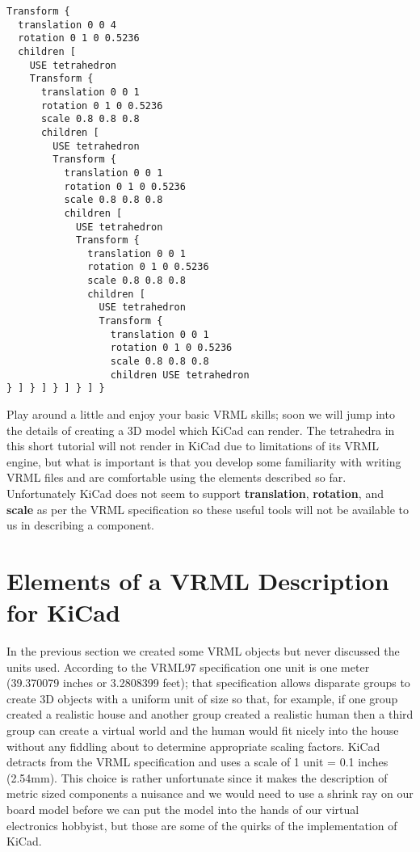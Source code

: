 \documentclass[a4paper, dvipdfm]{article}
\begin{document}
\begin{verbatim}
Transform {
  translation 0 0 4
  rotation 0 1 0 0.5236
  children [
    USE tetrahedron
    Transform {
      translation 0 0 1
      rotation 0 1 0 0.5236
      scale 0.8 0.8 0.8
      children [
        USE tetrahedron
        Transform {
          translation 0 0 1
          rotation 0 1 0 0.5236
          scale 0.8 0.8 0.8
          children [
            USE tetrahedron
            Transform {
              translation 0 0 1
              rotation 0 1 0 0.5236
              scale 0.8 0.8 0.8
              children [
                USE tetrahedron
                Transform {
                  translation 0 0 1
                  rotation 0 1 0 0.5236
                  scale 0.8 0.8 0.8
                  children USE tetrahedron
} ] } ] } ] } ] }
\end{verbatim}

Play around a little and enjoy your basic VRML skills; soon we will jump into the details of creating a
3D model which KiCad can render. The tetrahedra in this short tutorial will not render in KiCad due to
limitations of its VRML engine, but what is important is that you develop some familiarity with writing
VRML files and are comfortable using the elements described so far. Unfortunately KiCad does not seem to
support \textbf{translation}, \textbf{rotation}, and \textbf{scale} as per the VRML specification so these
useful tools will not be available to us in describing a component.

\section{Elements of a VRML Description for KiCad}
In the previous section we created some VRML objects but never discussed the units used. According to the VRML97
specification one unit is one meter (39.370079 inches or 3.2808399 feet); that specification allows disparate
groups to create 3D objects with a uniform unit of size so that, for example, if one group created a realistic
house and another group created a realistic human then a third group can create a virtual world and the human
would fit nicely into the house without any fiddling about to determine appropriate scaling factors. KiCad
detracts from the VRML specification and uses a scale of 1 unit = 0.1 inches (2.54mm). This choice is rather
unfortunate since it makes the description of metric sized components a nuisance and we would need to use a
shrink ray on our board model before we can put the model into the hands of our virtual electronics hobbyist,
but those are some of the quirks of the implementation of KiCad.
\end{document}
